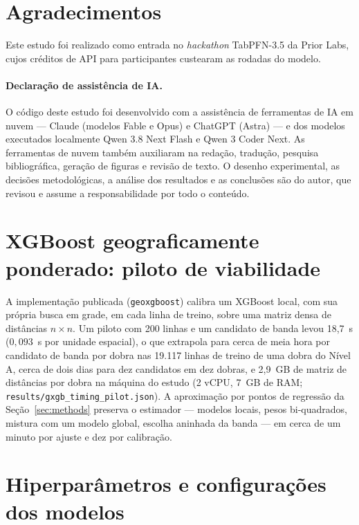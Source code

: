 \documentclass[11pt,a4paper]{article}
\begin{document}
\section*{Agradecimentos}
Este estudo foi realizado como entrada no \emph{hackathon} TabPFN-3.5 da Prior Labs, cujos
créditos de API para participantes custearam as rodadas do modelo.

\paragraph{Declaração de assistência de IA.} O código deste estudo foi desenvolvido com a
assistência de ferramentas de IA em nuvem --- Claude (modelos Fable e Opus) e ChatGPT (Astra)
--- e dos modelos executados localmente Qwen 3.8 Next Flash e Qwen 3 Coder Next. As
ferramentas de nuvem também auxiliaram na redação, tradução, pesquisa bibliográfica, geração de
figuras e revisão de texto. O desenho experimental, as decisões metodológicas, a análise dos
resultados e as conclusões são do autor, que revisou e assume a responsabilidade por todo o
conteúdo.




\appendix

\section{XGBoost geograficamente ponderado: piloto de viabilidade}
\label{app:gxgb}

A implementação publicada (\texttt{geoxgboost}) calibra um XGBoost local, com sua própria busca
em grade, em cada linha de treino, sobre uma matriz densa de distâncias $n \times n$. Um piloto
com 200 linhas e um candidato de banda levou 18,7~s ($0{,}093$~s por unidade espacial), o que
extrapola para cerca de meia hora por candidato de banda por dobra nas 19.117 linhas de treino
de uma dobra do Nível A, cerca de dois dias para dez candidatos em dez dobras, e 2,9~GB de
matriz de distâncias por dobra na máquina do estudo (2 vCPU, 7~GB de RAM;
\texttt{results/gxgb\_timing\_pilot.json}). A aproximação por pontos de regressão da
Seção~\ref{sec:methods} preserva o estimador --- modelos locais, pesos bi-quadrados, mistura
com um modelo global, escolha aninhada da banda --- em cerca de um minuto por ajuste e dez por
calibração.

\section{Hiperparâmetros e configurações dos modelos}
\label{app:hparams}
\end{document}
